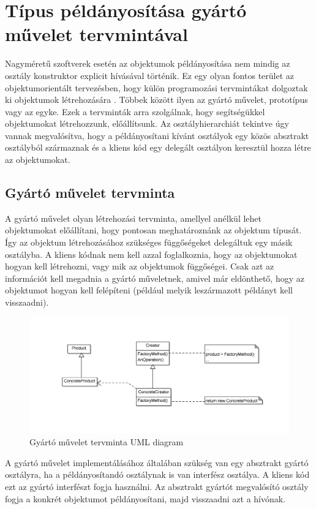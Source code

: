 \documentclass[a4paper,12pt]{report}
\begin{document}
\section{Típus példányosítása gyártó művelet tervmintával}
Nagyméretű szoftverek esetén az objektumok példányosítása nem mindig az osztály konstruktor explicit hívásával történik. Ez egy olyan fontos terület az objektumorientált tervezésben, hogy külön programozási tervmintákat dolgoztak ki objektumok létrehozására \cite{design_patterns}. Többek között ilyen az gyártó művelet, prototípus vagy az egyke. Ezek a tervminták arra szolgálnak, hogy segítségükkel objektumokat létrehozzunk, előállítsunk. Az osztályhierarchiát tekintve úgy vannak megvalósítva, hogy a példányosítani kívánt osztályok egy közös absztrakt osztályból származnak és a kliens kód egy delegált osztályon keresztül hozza létre az objektumokat.
\subsection{Gyártó művelet tervminta}
A gyártó művelet olyan létrehozási tervminta, amellyel anélkül lehet objektumokat előállítani, hogy pontosan meghatároznánk az objektum típusát. Így az objektum létrehozásához szükséges függőségeket delegáltuk egy másik osztályba. A kliens kódnak nem kell azzal foglalkoznia, hogy az objektumokat hogyan kell létrehozni, vagy mik az objektumok függőségei. Csak azt az információt kell megadnia a gyártó műveletnek, amivel már eldönthető, hogy az objektumot hogyan kell felépíteni (például melyik leszármazott példányt kell visszaadni).

\begin{figure}
	\caption{Gyártó művelet tervminta  UML diagram}
	\centering
	\includegraphics[width=15cm,keepaspectratio]{factory_method.png}
\end{figure}

A gyártó művelet implementálásához általában szükség van egy absztrakt gyártó osztályra, ha a példányosítandó osztálynak is van interfész osztálya. A kliens kód ezt az gyártó interfészt fogja használni. Az absztrakt gyártót megvalósító osztály  fogja a konkrét objektumot példányosítani, majd visszaadni azt a hívónak.
\end{document}
